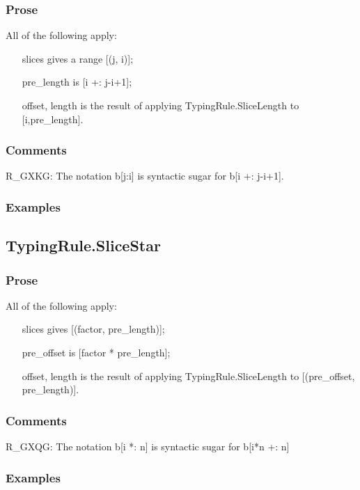 \documentclass{book}
\begin{document}
    \subsubsection{Prose}
    All of the following apply:
   \begin{itemize}
   \item [slices] gives a range [(j, i)];
   \item [pre\_length] is [i +: j-i+1];
   \item [offset, length] is the result of applying TypingRule.SliceLength to [i,pre\_length].
   \end{itemize}

    \subsubsection{Comments}
    R\_GXKG: The notation b[j:i] is syntactic sugar for b[i +: j-i+1].

    \subsubsection{Examples}

\subsection{TypingRule.SliceStar}

    \subsubsection{Prose}
    All of the following apply:
   \begin{itemize}
   \item [slices] gives [(factor, pre\_length)];
   \item [pre\_offset] is [factor * pre\_length];
   \item [offset, length] is the result of applying TypingRule.SliceLength to [(pre\_offset, pre\_length)].
   \end{itemize}

    \subsubsection{Comments}
    R\_GXQG: The notation b[i *: n] is syntactic sugar for b[i*n +: n]

    \subsubsection{Examples}
\end{document}
